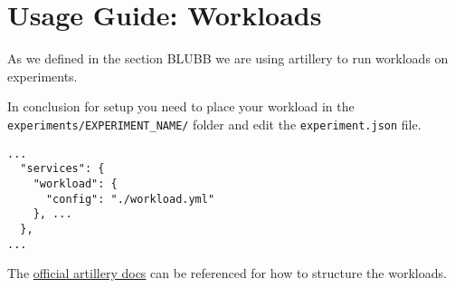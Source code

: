 \documentclass[../main.tex]{subfiles}
\begin{document}
\section{Usage Guide: Workloads}\label{sec:WorkloadsUsage}

As we defined in the section BLUBB we are using artillery to run workloads on experiments.   %

In conclusion for setup you need to place your workload in the \\
\texttt{experiments/EXPERIMENT\_NAME/} 
folder and edit the \texttt{experiment.json} file.




\begin{tcolorbox}
\begin{verbatim}
...
  "services": {
    "workload": {
      "config": "./workload.yml"
    }, ...
  },
...
\end{verbatim}
\end{tcolorbox}


The \href{https://artillery.io/docs/}{official artillery docs} can be referenced for how to structure the workloads.
\end{document}
